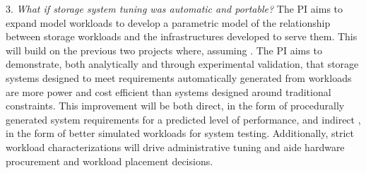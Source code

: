 \begin{myitemize}
\item[3.]
\emph{What if storage system tuning was automatic and portable?} The PI aims to
expand model workloads to develop a
parametric model of the relationship between storage workloads and the
infrastructures developed to serve them.  This will build on the previous two
projects where, assuming 
.  
The PI aims to
demonstrate, both analytically and through experimental validation, that storage
systems designed to meet requirements automatically generated from workloads are
more power and cost efficient than systems designed around traditional
constraints. This improvement will be both direct, in the form of procedurally
generated system requirements for a predicted level of performance, and indirect
, in the form of better simulated workloads for system testing.  Additionally,
strict workload characterizations will drive administrative tuning and aide hardware
procurement and workload placement decisions.



\end{myitemize}
